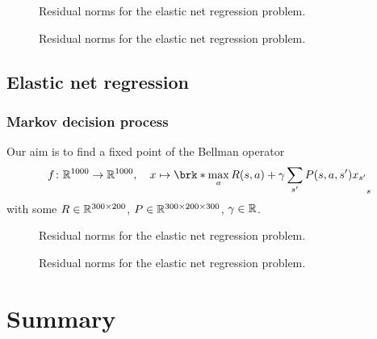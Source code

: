 \begin{frame}
	\begin{figure}
		\centering
		{\scriptsize
		
		}
		\caption{Residual norms for the elastic net regression problem.}
	\end{figure}
\end{frame}

\begin{frame}
	\begin{figure}
		\centering
		{\scriptsize
		
		}
		\caption{Residual norms for the elastic net regression problem.}
	\end{figure}
\end{frame}
\subsection{Elastic net regression}

\begin{frame}
	\frametitle{Markov decision process}
	Our aim is to find a fixed point of the Bellman operator
	\begin{align*}
		f\colon\R^{1000}\to\R^{1000}, \quad x\mapsto \brk*{\max_{a}R(s,a)+\gamma \sum_{s'}P(s,a,s')x_{s'}}_{s}
	\end{align*}
	with some $R\in\mathbb{R}^{300\times 200}$, $P\in\mathbb{R}^{300\times 200\times 300}$, $\gamma\in\mathbb{R}$.
\end{frame}


\begin{frame}
	\begin{figure}
		\centering
		{\scriptsize
		
		}
		\caption{Residual norms for the elastic net regression problem.}
	\end{figure}
\end{frame}

\begin{frame}
	\begin{figure}
		\centering
		{\scriptsize
		
		}
		\caption{Residual norms for the elastic net regression problem.}
	\end{figure}
\end{frame}

\section{Summary}

